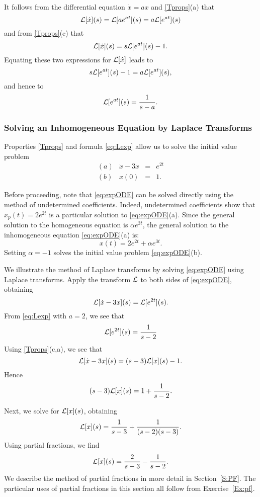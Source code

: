 \documentclass{ximera}
\begin{document}
It follows from the differential equation $\dot{x}=ax$ and \eqref{Tprops}(a) 
that
\[
{\cal L}[\dot{x}](s) = {\cal L}[ae^{at}](s) = a{\cal L}[e^{at}](s)
\]
and from \eqref{Tprops}(c) that
\[
{\cal L}[\dot{x}](s) = s{\cal L}[e^{at}](s)-1.
\]
Equating these two expressions for ${\cal L}[\dot{x}]$ leads to
\[
s{\cal L}[e^{at}](s)-1 = a{\cal L}[e^{at}](s),
\]
and hence to 
\begin{equation} \label{eq:Lexp}
{\cal L}[e^{at}](s) = \frac{1}{s-a}.
\end{equation}

\subsubsection*{Solving an Inhomogeneous Equation by Laplace Transforms}

Properties \eqref{Tprops} and formula \eqref{eq:Lexp} allow us to solve the 
initial value problem 
\begin{equation} \label{eq:expODE}
\begin{array}{crcl}
(a) & \dot{x} - 3x & = & e^{2t}\\
(b) & x(0) & = & 1.
\end{array}
\end{equation}

Before proceeding, note that \eqref{eq:expODE} can be solved directly using
the method of undetermined coefficients.    
Indeed, undetermined coefficients show that $x_p(t) = 2e^{2t}$ is a 
particular solution to \eqref{eq:expODE}(a).  Since the general solution to the 
homogeneous equation is $\alpha e^{3t}$, the general solution to the 
inhomogeneous equation \eqref{eq:expODE}(a) is:
\[
x(t) = 2e^{2t} + \alpha e^{3t}.
\]
Setting $\alpha=-1$ solves the initial value problem \eqref{eq:expODE}(b).

We illustrate the method of Laplace transforms by solving \eqref{eq:expODE} 
using Laplace transforms.  Apply the transform ${\cal L}$ to both sides of 
\eqref{eq:expODE}, obtaining 
\[
{\cal L}[\dot{x}-3x](s) = {\cal L}[e^{2t}](s).
\]
From \eqref{eq:Lexp} with $a=2$, we see that
\[
{\cal L}[e^{2t}](s) = \frac{1}{s-2}
\]
Using \eqref{Tprops}(c,a), we see that  
\[
{\cal L}[\dot{x}-3x](s) = (s-3){\cal L}[x](s) - 1.
\]
Hence 
\[
(s-3){\cal L}[x](s) = 1 + \frac{1}{s-2}.
\]

Next, we solve for ${\cal L}[x](s)$, obtaining
\[
{\cal L}[x](s) = \frac{1}{s-3} + \frac{1}{(s-2)(s-3)}.
\]
Using partial fractions, we find  
\[
{\cal L}[x](s)  = \frac{2}{s-3} - \frac{1}{s-2}.
\]
We describe the method of partial fractions in more detail in 
Section~\ref{S:PF}.  The particular uses of partial fractions in this section 
all follow from Exercise~\ref{Ex:pf}. 
\end{document}

